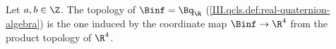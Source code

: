 Let $a,b\in\Z$. The topology of $\Binf=\Bq_\R$ (\cref{III.qcls.def:real-quaternion-algebra}) is the one induced by the coordinate map $\Binf\to\R^4$ from the product
topology of $\R^4$.

